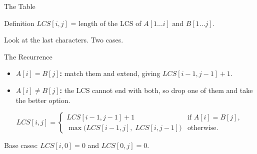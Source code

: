 \documentclass[10pt,aspectratio=169]{beamer}
\begin{document}
\begin{frame}{The Table}
  \begin{block}{Definition}
    $LCS[i,j]$ = length of the LCS of $A[1 \ldots i]$ and $B[1 \ldots j]$.
  \end{block}

  \bigskip
  Look at the last characters. Two cases.

  \bigskip
  \begin{center}
  \end{center}
\end{frame}

\begin{frame}{The Recurrence}
  \begin{itemize}
    \item \textbf{$A[i] = B[j]$:} match them and extend, giving $LCS[i-1,j-1] + 1$.
    \pause
    \item \textbf{$A[i] \ne B[j]$:} the LCS cannot end with both, so drop one of
          them and take the better option.
  \end{itemize}

  \pause
  \bigskip
  \begin{alertblock}{}
    \[
      LCS[i,j] = \begin{cases}
        LCS[i-1,j-1] + 1 & \text{if } A[i] = B[j], \\[0.3em]
        \max\big( LCS[i-1,j],\; LCS[i,j-1] \big) & \text{otherwise.}
      \end{cases}
    \]
  \end{alertblock}

  \bigskip
  Base cases: $LCS[i,0] = 0$ and $LCS[0,j] = 0$.
\end{frame}
\end{document}
